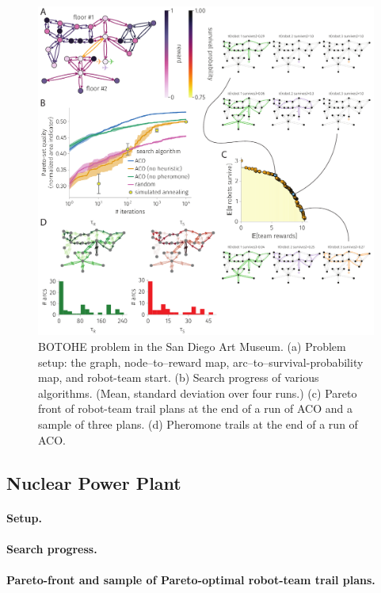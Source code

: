 \documentclass[fleqn,10pt,lineno]{wlpeerj}
\begin{document}
\begin{figure}[h!]
    \centering
    	\includegraphics[width=\textwidth]{art_museum_results.pdf}
    \caption{
    BOTOHE problem in the San Diego Art Museum. 
    (a) Problem setup: the graph, node--to--reward map, arc--to--survival-probability map, and robot-team start.
    (b) Search progress of various algorithms. (Mean, standard deviation over four runs.)
    (c) Pareto front of robot-team trail plans at the end of a run of ACO and a sample of three plans.
    (d) Pheromone trails at the end of a run of ACO.
    } \label{fig:art_museum}
\end{figure}


\subsection{Nuclear Power Plant}
\paragraph{Setup.}

\paragraph{Search progress.}

\paragraph{Pareto-front and sample of Pareto-optimal robot-team trail plans.}
\end{document}
